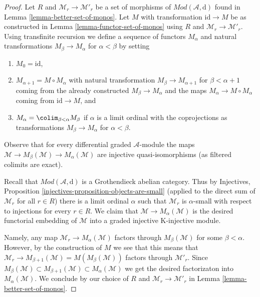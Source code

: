 \begin{proof}
Let $R$ and $\mathcal{M}_r \to \mathcal{M}'_r$ be a set of
morphisms of $\textit{Mod}(\mathcal{A}, \text{d})$ found in
Lemma \ref{lemma-better-set-of-monos}.
Let $M$ with transformation $\text{id} \to M$
be as constructed in Lemma \ref{lemma-functor-set-of-monos}
using $R$ and $\mathcal{M}_r \to \mathcal{M}'_r$.
Using transfinite recursion we define a sequence of functors
$M_\alpha$ and natural transformations $M_\beta \to M_\alpha$
for $\alpha < \beta$ by setting
\begin{enumerate}
\item $M_0 = \text{id}$,
\item $M_{\alpha + 1} = M \circ M_\alpha$ with natural transformation
$M_\beta \to M_{\alpha + 1}$ for $\beta < \alpha + 1$
coming from the already constructed $M_\beta \to M_\alpha$ and the
maps $M_\alpha \to M \circ M_\alpha$ coming from $\text{id} \to M$, and
\item $M_\alpha = \colim_{\beta < \alpha} M_\beta$ if $\alpha$
is a limit ordinal with the coprojections as transformations
$M_\beta \to M_\alpha$ for $\alpha < \beta$.
\end{enumerate}
Observe that for every differential graded $\mathcal{A}$-module the maps
$\mathcal{M} \to M_\beta(\mathcal{M}) \to M_\alpha(\mathcal{M})$
are injective quasi-isomorphisms (as filtered colimits are exact).

\medskip\noindent
Recall that $\textit{Mod}(\mathcal{A}, \text{d})$ is a Grothendieck
abelian category. Thus by
Injectives, Proposition \ref{injectives-proposition-objects-are-small}
(applied to the direct sum of $\mathcal{M}_r$ for all $r \in R$)
there is a limit ordinal $\alpha$ such that $\mathcal{M}_r$ is $\alpha$-small
with respect to injections for every $r \in R$.
We claim that $\mathcal{M} \to M_\alpha(\mathcal{M})$ is
the desired functorial embedding of $\mathcal{M}$ into a
graded injective K-injective module.

\medskip\noindent
Namely, any map $\mathcal{M}_r \to M_\alpha(\mathcal{M})$
factors through $M_\beta(\mathcal{M})$ for some $\beta < \alpha$.
However, by the construction of $M$ we see that this means
that $\mathcal{M}_r \to M_{\beta + 1}(\mathcal{M}) = M(M_\beta(\mathcal{M}))$
factors through $\mathcal{M}'_r$. Since
$M_\beta(\mathcal{M}) \subset  M_{\beta + 1}(\mathcal{M})
\subset M_\alpha(\mathcal{M})$ we get the desired factorizaton
into $M_\alpha(\mathcal{M})$. We conclude by our choice of
$R$ and $\mathcal{M}_r \to \mathcal{M}'_r$ in
Lemma \ref{lemma-better-set-of-monos}.
\end{proof}










